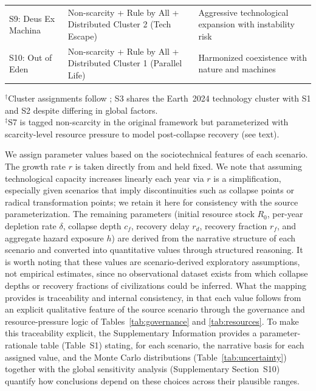 \begin{table}[htbp]
{\begin{tabular}{l p{4.5cm} p{5.5cm}}
S9: Deus Ex Machina &
Non-scarcity + Rule by All + Distributed \newline Cluster 2 (Tech Escape) &
Aggressive technological expansion with instability risk \\

S10: Out of Eden &
Non-scarcity + Rule by All + Distributed \newline Cluster 1 (Parallel Life) &
Harmonized coexistence with nature and machines \\
\bottomrule
\end{tabular}
}

\smallskip
{\footnotesize $^{\dagger}$Cluster assignments follow \citet{Haqq-Misra2025-rt}; S3 shares the Earth~2024 technology cluster with S1 and S2 despite differing in global factors.\\
$^{\ddagger}$S7 is tagged non-scarcity in the original framework but parameterized with scarcity-level resource pressure to model post-collapse recovery (see text).}
\end{table}

We assign parameter values based on the sociotechnical features of each scenario. The growth rate \(r\) is taken directly from \citet{Haqq-Misra2025-rt} and held fixed. We note that assuming technological capacity increases linearly each year via \(r\) is a simplification, especially given scenarios that imply discontinuities such as collapse points or radical transformation points; we retain it here for consistency with the source parameterization. The remaining parameters (initial resource stock \(R_{0}\), per-year depletion rate \(\delta\), collapse depth \(c_{f}\), recovery delay \(r_{d}\), recovery fraction \(r_{f}\), and aggregate hazard exposure \(h\)) are derived from the narrative structure of each scenario and converted into quantitative values through structured reasoning. It is worth noting that these values are scenario-derived exploratory assumptions, not empirical estimates, since no observational dataset exists from which collapse depths or recovery fractions of civilizations could be inferred. What the mapping provides is traceability and internal consistency, in that each value follows from an explicit qualitative feature of the source scenario through the governance and resource-pressure logic of Tables~\ref{tab:governance} and \ref{tab:resources}. To make this traceability explicit, the Supplementary Information provides a parameter-rationale table (Table~S1) stating, for each scenario, the narrative basis for each assigned value, and the Monte Carlo distributions (Table~\ref{tab:uncertainty}) together with the global sensitivity analysis (Supplementary Section~S10) quantify how conclusions depend on these choices across their plausible ranges.

